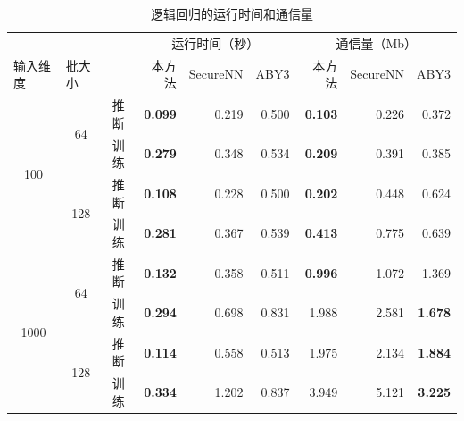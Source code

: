 \begin{table}[h!]
\caption{逻辑回归的运行时间和通信量}
\label{tab:ss-perm:logistic}
\renewcommand{\arraystretch}{0.8}
\begin{tabular}{@{}cccrrrrrr@{}}
    \toprule
    \multicolumn{1}{l}{}     & \multicolumn{1}{l}{}    &    & \multicolumn{3}{c}{运行时间（秒）}       & \multicolumn{3}{c}{通信量（Mb）}       \\ 
    \cmidrule(lr){4-6}\cmidrule(lr){7-9}
    \multicolumn{1}{l}{输入维度} & \multicolumn{1}{l}{批大小} &    & 本方法            & SecureNN & ABY3  & 本方法            & SecureNN & ABY3  \\ 
    \cmidrule(lr){1-3}\cmidrule(lr){4-6}\cmidrule(lr){7-9}
    \multirow{4}{*}{100}     & \multirow{2}{*}{64}     & 推断 & \textbf{0.099} & 0.219    & 0.500 & \textbf{0.103} & 0.226    & 0.372 \\ \cmidrule(l){3-3}\cmidrule(lr){4-6}\cmidrule(lr){7-9}
        &                      & 训练 & \textbf{0.279} & 0.348 & 0.534 & \textbf{0.209} & 0.391 & 0.385          \\ \cmidrule(l){2-3}\cmidrule(lr){4-6}\cmidrule(lr){7-9}
        & \multirow{2}{*}{128} & 推断 & \textbf{0.108} & 0.228 & 0.500 & \textbf{0.202} & 0.448 & 0.624          \\ \cmidrule(l){3-3}\cmidrule(lr){4-6}\cmidrule(lr){7-9}
        &                      & 训练 & \textbf{0.281} & 0.367 & 0.539 & \textbf{0.413} & 0.775 & 0.639          \\ \midrule
    \multirow{4}{*}{1000}    & \multirow{2}{*}{64}     & 推断 & \textbf{0.132} & 0.358    & 0.511 & \textbf{0.996} & 1.072    & 1.369 \\ \cmidrule(l){3-3}\cmidrule(lr){4-6}\cmidrule(lr){7-9}
        &                      & 训练 & \textbf{0.294} & 0.698 & 0.831 & 1.988          & 2.581 & \textbf{1.678} \\ \cmidrule(l){2-3}\cmidrule(lr){4-6}\cmidrule(lr){7-9}
        & \multirow{2}{*}{128} & 推断 & \textbf{0.114} & 0.558 & 0.513 & 1.975          & 2.134 & \textbf{1.884} \\ \cmidrule(l){3-3}\cmidrule(lr){4-6}\cmidrule(lr){7-9}
        &                      & 训练 & \textbf{0.334} & 1.202 & 0.837 & 3.949          & 5.121 & \textbf{3.225} \\ \bottomrule
\end{tabular}
\end{table}

